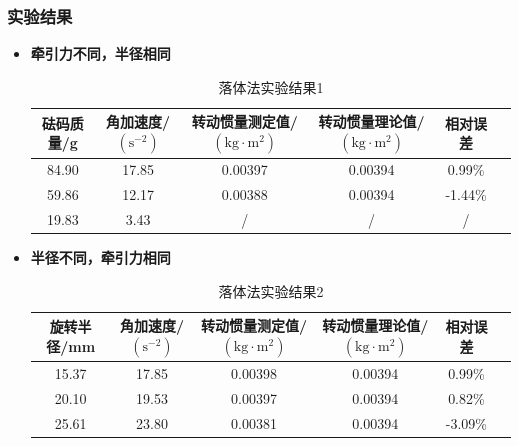 \documentclass[12pt,hyperref,a4paper,UTF8]{ctexart}
\begin{document}
\subsubsection{实验结果}
    \begin{itemize}
        \item \textbf{牵引力不同，半径相同}
            \begin{table}[h!]
                \centering
                \begin{tabular}{cccccc}
                \toprule
                \textbf{砝码质量/g} & \textbf{角加速度/$(\text{s}^{-2})$} & \textbf{转动惯量测定值/$(\text{kg}\cdot \text{m}^2)$} & \textbf{转动惯量理论值/$(\text{kg}\cdot \text{m}^2)$} & \textbf{相对误差} \\
                \midrule
                84.90 & 17.85 & 0.00397 & 0.00394 & 0.99\% \\
                59.86 & 12.17 & 0.00388 & 0.00394 & -1.44\% \\
                19.83 & 3.43 & /          & /          & / \\
                \bottomrule
                \end{tabular}
                \caption{落体法实验结果1}
                \end{table}
                
        \item \textbf{半径不同，牵引力相同}
            \begin{table}[h!]
                \centering
                \begin{tabular}{cccccc}
                \toprule
                \textbf{旋转半径/mm} & \textbf{角加速度/$(\text{s}^{-2})$} & \textbf{转动惯量测定值/$(\text{kg}\cdot \text{m}^2)$} & \textbf{转动惯量理论值/$(\text{kg}\cdot \text{m}^2)$} & \textbf{相对误差} \\
                \midrule
                15.37 & 17.85 & 0.00398 & 0.00394 & 0.99\% \\
                20.10 & 19.53 & 0.00397 & 0.00394 & 0.82\% \\
                25.61 & 23.80 & 0.00381 & 0.00394 & -3.09\% \\
                \bottomrule
                \end{tabular}
                \caption{落体法实验结果2}
                \end{table}
                
    \end{itemize}
\end{document}
